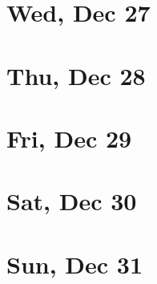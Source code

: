 	\section{Wed, Dec 27}
		
		
	\section{Thu, Dec 28}
		
		
	\section{Fri, Dec 29}
		
		
	\section{Sat, Dec 30}
		
		
	\section{Sun, Dec 31}
		
		

